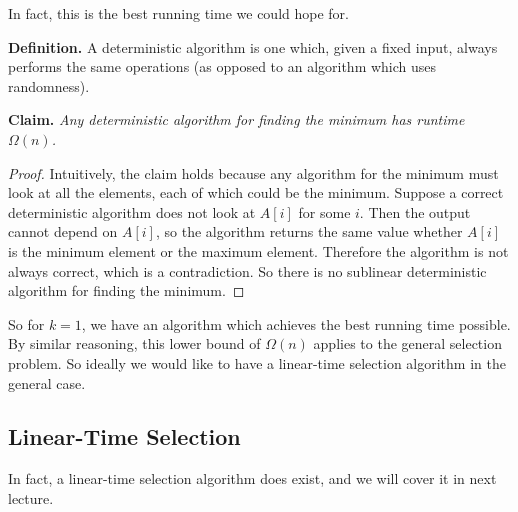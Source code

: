 \documentclass [12pt]{article}
\begin{document}
In fact, this is the best running time we could hope for.

\textbf{Definition.} A deterministic algorithm is one which, given a fixed input, always performs the same operations (as opposed to an algorithm which uses randomness).

\textbf{Claim.} \textit{Any deterministic algorithm for finding the minimum has runtime $\Omega(n)$.}

\begin{proof}
Intuitively, the claim holds because any algorithm for the minimum must
look at all the elements, each of which could be the minimum. Suppose a correct deterministic algorithm does not look at $A[i]$ for some $i$. Then the output cannot depend on $A[i]$, so the algorithm returns the same value whether $A[i]$ is the minimum element or the maximum element. Therefore the algorithm is not always correct, which is a contradiction. So there is no sublinear deterministic algorithm for finding the minimum.
\end{proof}

So for $k = 1$, we have an algorithm which achieves the best running time possible. By similar reasoning, this lower bound of $\Omega(n)$ applies to the general selection problem. So ideally we would like to have a linear-time selection algorithm in the general case.

\subsection{Linear-Time Selection}
In fact, a linear-time selection algorithm does exist, and we will cover it in next lecture.
\end{document}
